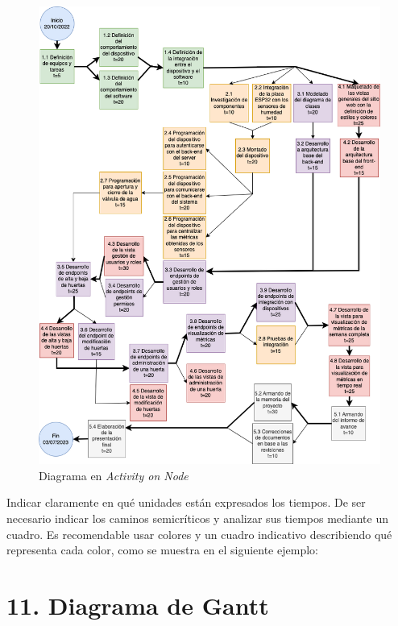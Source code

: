 \documentclass[
11pt, %
codirector, %
]{charter}
\begin{document}
\begin{figure}[htpb]
\centering 
\includegraphics[width=.8\textwidth]{./Figuras/AoN.png}
\caption{Diagrama en \textit{Activity on Node}}
\label{fig:AoN}
\end{figure}

Indicar claramente en qué unidades están expresados los tiempos.
De ser necesario indicar los caminos semicríticos y analizar sus tiempos mediante un cuadro.
Es recomendable usar colores y un cuadro indicativo describiendo qué representa cada color, como se muestra en el siguiente ejemplo:



\section{11. Diagrama de Gantt}
\label{sec:gantt}
\end{document}
